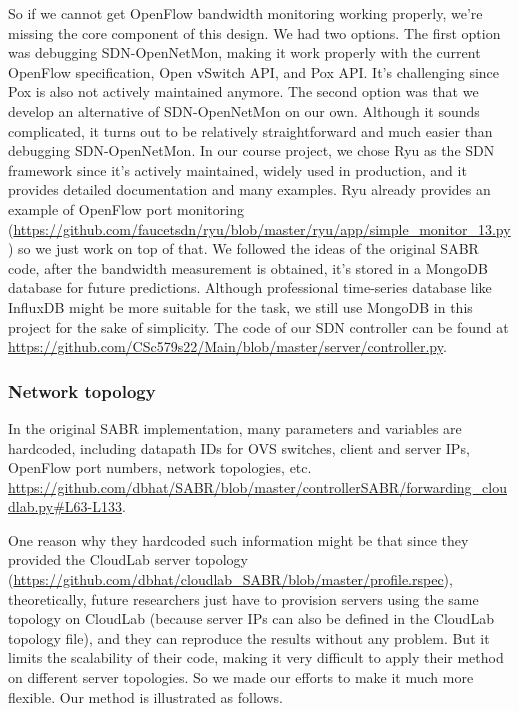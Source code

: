 \documentclass[12pt]{article}
\begin{document}
So if we cannot get OpenFlow bandwidth monitoring working properly, we're missing the core component of this design. We had two options. The first option was debugging SDN-OpenNetMon, making it work properly with the current OpenFlow specification, Open vSwitch API, and Pox API. It's challenging since Pox is also not actively maintained anymore. The second option was that we develop an alternative of SDN-OpenNetMon on our own. Although it sounds complicated, it turns out to be relatively straightforward and much easier than debugging SDN-OpenNetMon. In our course project, we chose Ryu \cite{ryu} as the SDN framework since it's actively maintained, widely used in production, and it provides detailed documentation and many examples. Ryu already provides an example of OpenFlow port monitoring (\url{https://github.com/faucetsdn/ryu/blob/master/ryu/app/simple_monitor_13.py}) so we just work on top of that. We followed the ideas of the original SABR code, after the bandwidth measurement is obtained, it's stored in a MongoDB database for future predictions. Although professional time-series database like InfluxDB might be more suitable for the task, we still use MongoDB in this project for the sake of simplicity. The code of our SDN controller can be found at \url{https://github.com/CSc579s22/Main/blob/master/server/controller.py}.

\subsubsection{Network topology}
In the original SABR implementation, many parameters and variables are hardcoded, including datapath IDs for OVS switches, client and server IPs, OpenFlow port numbers, network topologies, etc.  \url{https://github.com/dbhat/SABR/blob/master/controllerSABR/forwarding_cloudlab.py#L63-L133}. 

One reason why they hardcoded such information might be that since they provided the CloudLab server topology (\url{https://github.com/dbhat/cloudlab_SABR/blob/master/profile.rspec}), theoretically, future researchers just have to provision servers using the same topology on CloudLab (because server IPs can also be defined in the CloudLab topology file), and they can reproduce the results without any problem. But it limits the scalability of their code, making it very difficult to apply their method on different server topologies. So we made our efforts to make it much more flexible. Our method is illustrated as follows.
\end{document}
